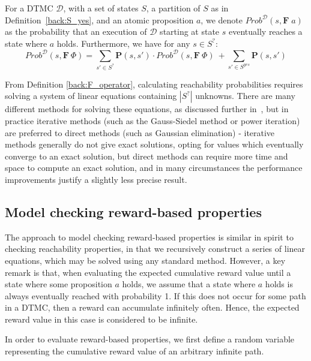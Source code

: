 \begin{definition}
\label{back:F_operator}

    For a DTMC $\mathcal{D}$, with a set of states $S$, a partition of $S$ as in Definition~\ref{back:S_yes}, and an atomic proposition $a$, we denote $Prob^{\mathcal{D}}(s, \mathbf{F} \; a)$ as the probability that an execution of $\mathcal{D}$ starting at state $s$ eventually reaches a state where $a$ holds. Furthermore, we have for any $s \in S^{?}$:
    \begin{equation*}
        Prob^{\mathcal{D}}(s, \mathbf{F} \: \Phi) = \mbox{$\sum_{s' \in S^{?}}$} \mathbf{P}(s, s') \cdot Prob^{\mathcal{D}}(s, \mathbf{F} \: \Phi) \: + \mbox{$\sum_{s' \in S^{yes}}$} \mathbf{P}(s, s')
    \end{equation*}
\end{definition}
From Definition \ref{back:F_operator}, calculating reachability probabilities requires solving a system of linear equations containing $|S^{?}|$ unknowns. There are many different methods for solving these equations, as discussed further in~\cite{demmel_applied_1997}, but in practice iterative methods (such as the Gauss-Siedel method or power iteration) are preferred to direct methods (such as Gaussian elimination) - iterative methods generally do not give exact solutions, opting for values which eventually converge to an exact solution, but direct methods can require more time and space to compute an exact solution, and in many circumstances the performance improvements justify a slightly less precise result.

\subsection{Model checking reward-based properties}
\label{back:check_rewards}

The approach to model checking reward-based properties is similar in spirit to checking reachability properties, in that we recursively construct a series of linear equations, which may be solved using any standard method. However, a key remark is that, when evaluating the expected cumulative reward value until a state where some proposition $a$ holds, we assume that a state where $a$ holds is always eventually reached with probability 1. If this does not occur for some path in a DTMC, then a reward can accumulate infinitely often. Hence, the expected reward value in this case is considered to be infinite.

In order to evaluate reward-based properties, we first define a random variable representing the cumulative reward value of an arbitrary infinite path.


